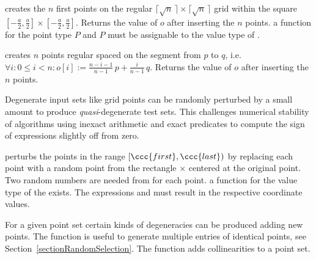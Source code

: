 { creates the $n$ first points on the regular $\lceil\sqrt{n}\,\rceil
    \times \lceil  \sqrt{n}\,\rceil$ grid within the square
  $[-\frac{a}{2},\frac{a}{2}]\times [-\frac{a}{2},\frac{a}{2}]$.
  Returns the value of $o$ after inserting the $n$ points.
  \ccPrecond a function  for the point type
  $P$ and $P$ must be assignable to the value type of 
  .} 

{ creates $n$ points regular spaced on the segment from $p$ to $q$,
    i.e.~$\forall i: 0 \le i < n: o[i] := \frac{n-i-1}{n-1}\, p +
    \frac{i}{n-1}\, q$. Returns the value of $o$ after inserting
    the $n$ points.}


Degenerate input sets like grid points can be randomly perturbed by a
small amount to produce {\em quasi}-degenerate test sets. This
challenges numerical stability of algorithms using inexact arithmetic and
exact predicates to compute the sign of expressions slightly off from zero.

{ perturbs the points in the range $[\ccc{first},\ccc{last})$ by
  replacing each point with a random point from the rectangle
   $\times$  centered at the original point.
  Two random numbers are needed from  for each point.
  \ccPrecond a function  for the value type of
    the  exists. 
    The expressions  and
     must result in the respective
    coordinate values.
}


For a given point set certain kinds of degeneracies can be produced
adding new points. The  function is
useful to generate multiple entries of identical points, see
Section~\ref{sectionRandomSelection}. The
 function adds collinearities to
a point set.


